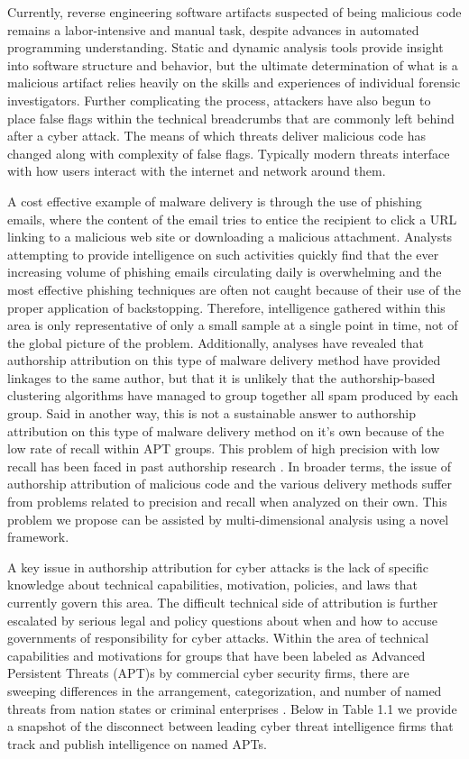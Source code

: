 \documentclass[12pt]{report}
\begin{document}
Currently, reverse engineering software artifacts suspected of being malicious code remains a labor-intensive and manual task, despite advances in automated programming understanding.  Static and dynamic analysis tools provide insight into software structure and behavior, but the ultimate determination of what is a malicious artifact relies heavily on the skills and experiences of individual forensic investigators.  Further complicating the process, attackers have also begun to place false flags within the technical breadcrumbs that are commonly left behind after a cyber attack.  The means of which threats deliver malicious code has changed along with complexity of false flags.  Typically modern threats interface with how users interact with the internet and network around them. 

A cost effective example of malware delivery is through the use of phishing emails, where the content of the email tries to entice the recipient to click a URL linking to a malicious web site or downloading a malicious attachment. Analysts attempting to provide intelligence on such activities quickly find that the ever increasing volume of phishing emails circulating daily is overwhelming and the most effective phishing techniques are often not caught because of their use of the proper application of backstopping.  Therefore, intelligence gathered within this area is only representative of only a small sample at a single point in time, not of the global picture of the problem.  Additionally, analyses have revealed that authorship attribution on this type of malware delivery method have provided linkages to the same author, but that it is unlikely that the authorship-based clustering algorithms have managed to group together all spam produced by each group.  Said in another way, this is not a sustainable answer to authorship attribution on this type of malware delivery method on it's own because of the low rate of recall within APT groups.  This problem of high precision with low recall has been faced in past authorship research \cite{li2017association}.  In broader terms, the issue of authorship attribution of malicious code and the various delivery methods suffer from problems related to precision and recall when analyzed on their own.  This problem we propose can be assisted by multi-dimensional analysis using a novel framework.

A key issue in authorship attribution for cyber attacks is the lack of specific knowledge about technical capabilities, motivation, policies, and laws that currently govern this area.  The difficult technical side of attribution is further escalated by serious legal and policy questions about when and how to accuse governments of responsibility for cyber attacks.  Within the area of technical capabilities and motivations for groups that have been labeled as Advanced Persistent Threats (APT)s by commercial cyber security firms, there are sweeping differences in the arrangement, categorization, and number of named threats from nation states or criminal enterprises \cite{romanosky2019private}.  Below in Table 1.1 we provide a snapshot of the disconnect between leading cyber threat intelligence firms that track and publish intelligence on named APTs.
\end{document}
